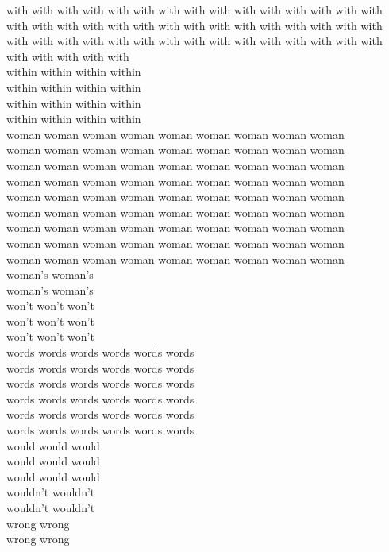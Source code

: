 with with with with with with with with with with with with with with with with with with with with with with with with with with with with with with with with with with with with with with with with with with with with with with with with with with\\
within within within within\\
within within within within\\
within within within within\\
within within within within\\
woman woman woman woman woman woman woman woman woman\\
woman woman woman woman woman woman woman woman woman\\
woman woman woman woman woman woman woman woman woman\\
woman woman woman woman woman woman woman woman woman\\
woman woman woman woman woman woman woman woman woman\\
woman woman woman woman woman woman woman woman woman\\
woman woman woman woman woman woman woman woman woman\\
woman woman woman woman woman woman woman woman woman\\
woman woman woman woman woman woman woman woman woman\\
woman's woman's\\
woman's woman's\\
won't won't won't\\
won't won't won't\\
won't won't won't\\
words words words words words words\\
words words words words words words\\
words words words words words words\\
words words words words words words\\
words words words words words words\\
words words words words words words\\
would would would\\
would would would\\
would would would\\
wouldn't wouldn't\\
wouldn't wouldn't\\
wrong wrong\\
wrong wrong\\


